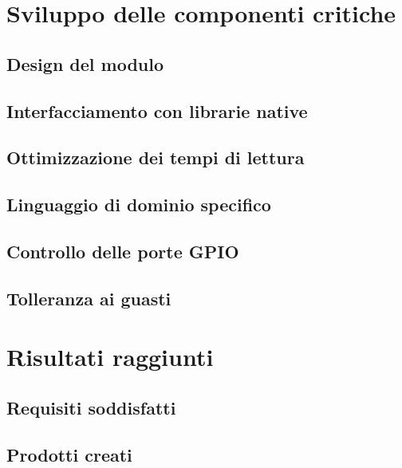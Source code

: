 

\section{Sviluppo delle componenti critiche}
\subsection{Design del modulo}
\subsection{Interfacciamento con librarie native}
\subsection{Ottimizzazione dei tempi di lettura}
\subsection{Linguaggio di dominio specifico}
\subsection{Controllo delle porte GPIO}
\subsection{Tolleranza ai guasti}


\section{Risultati raggiunti}
\subsection{Requisiti soddisfatti}
\subsection{Prodotti creati}